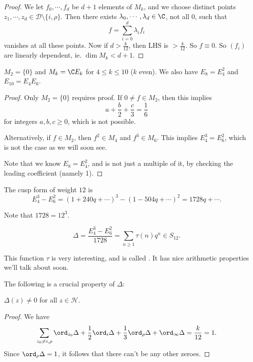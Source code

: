 \documentclass[a4paper]{article}
\renewcommand{\H}{\mathcal{H}}
\begin{document}
\begin{proof}
  We let $f_0, \cdots, f_d$ be $d + 1$ elements of $M_k$, and we choose distinct points $z_1, \cdots, z_d \in \mathcal{D} \setminus \{i, \rho\}$. Then there exists $\lambda_0, \cdots, \lambda_d \in \C$, not all $0$, such that
  \[
    f = \sum_{i = 0}^d \lambda_i f_i
  \]
  vanishes at all these points. Now if $d > \frac{k}{12}$, then LHS is $> \frac{k}{12}$. So $f \equiv 0$. So $(f_i)$ are linearly dependent, ie. $\dim M_k < d + 1$.
\end{proof}

\begin{cor}\leavevmode
  $M_2 = \{0\}$ and $M_k = \C E_k$ for $4 \leq k \leq 10$ ($k$ even). We also have $E_8 = E_4^2$ and $E_{10} = E_4 E_6$.
\end{cor}

\begin{proof}
  Only $M_2 = \{0\}$ requires proof. If $0 \not= f \in M_2$, then this implies
  \[
    a + \frac{b}{2} + \frac{c}{3} = \frac{1}{6}
  \]
  for integers $a, b, c \geq 0$, which is not possible.

  Alternatively, if $f \in M_2$, then $f^2 \in M_4$ and $f^3 \in M_6$. This implies $E_4^3 = E_6^2$, which is not the case as we will soon see.

  Note that we know $E_8 = E_4^2$, and is not just a multiple of it, by checking the leading coefficient (namely 1).
\end{proof}

\begin{cor}
  The cusp form of weight $12$ is
  \[
    E_4^3 - E_6^2 = (1 + 240 q + \cdots)^3 - (1 - 504 q + \cdots)^2 = 1728q + \cdots.
  \]
\end{cor}
Note that $1728 = 12^3$.

\begin{defi}\index{$\Delta$}
  \[
    \Delta = \frac{E_4^3 - E_6^2}{1728} = \sum_{n \geq 1} \tau(n) q^n \in S_{12}.
  \]
\end{defi}
This function $\tau$ is very interesting, and is called . It has nice arithmetic properties we'll talk about soon.

The following is a crucial property of $\Delta$:
\begin{prop}
  $\Delta(z) \not= 0$ for all $z \in \H$.
\end{prop}

\begin{proof}
  We have
  \[
    \sum_{z_0 \not= i, \rho} \ord_{z_0} \Delta + \frac{1}{2} \ord_i \Delta + \frac{1}{3} \ord_\rho \Delta + \ord_\infty \Delta = \frac{k}{12} = 1.
  \]
  Since $\ord_\rho \Delta = 1$, it follows that there can't be any other zeroes.
\end{proof}
\end{document}
